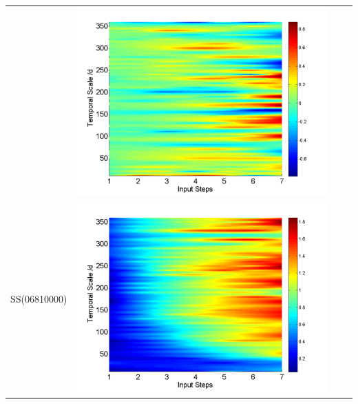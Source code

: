 \documentclass[draft,wrr]{AGUTeX}
\begin{document}
\begin{article}
\begin{table}[H]
\begin{tabular}{cccc}
&\begin{minipage}{.3\textwidth}\includegraphics[width=\linewidth]{resultgraph/11532500diff_q.png}\end{minipage}
\\
SS(06810000)
&\begin{minipage}{.3\textwidth}\includegraphics[width=\linewidth]{resultgraph/06810000p.png}\end{minipage}

\end{tabular}
\end{table}
\end{article}
\end{document}
